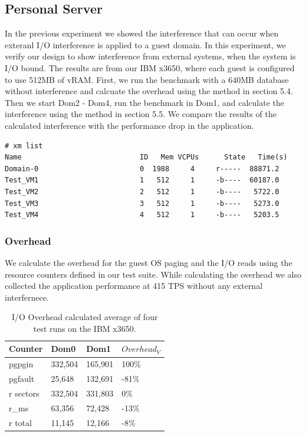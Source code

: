 \subsection{Personal Server}
In the previous experiment we showed the interference that can occur when exteranl I/O interference is applied to a guest domain.
In this experiment, we verify our design to show interference from external systems, when the system is I/O bound.
The results are from our IBM x3650, where each guest is configured to use 512MB of vRAM.
First, we run the benchmark with a 640MB database without interference and calcuate the overhead using the method in section 5.4.  
Then we start Dom2 - Dom4, run the benchmark in Dom1, and calculate the interference using the method in section 5.5.  
We compare the results of the calculated interference with the performance drop in the application.

\begin{Verbatim}
# xm list
Name                            ID   Mem VCPUs      State   Time(s)
Domain-0                        0  1988     4     r-----  88871.2
Test_VM1                        1   512     1     -b----  60187.0
Test_VM2                        2   512     1     -b----   5722.0
Test_VM3                        3   512     1     -b----   5273.0
Test_VM4                        4   512     1     -b----   5203.5
\end{Verbatim}

\subsubsection{Overhead}
We calculate the overhead for the guest OS paging and the I/O reads using the resource counters defined in our test suite.  While calculating the overhead we also collected the application performance at 415 TPS without any external interfernece.

\begin{table}[h]
\begin{tabular}{ l l l p{5cm} }
  Counter & Dom0 & Dom1 & $Overhead_V$ \\
  \hline
	pgpgin    & 332,504 & 165,901 & 100\% \\
	pgfault   &  25,648 & 132,691 & -81\% \\
	r sectors & 332,504 & 331,803 &   0\% \\
	r\_ms     &  63,356 &  72,428 & -13\% \\
	r total   &  11,145 &  12,166 &  -8\% \\
  \hline
\end{tabular}
\caption{I/O Overhead calculated average of four test runs on the IBM x3650.}
\label{tab:OverheadSmall}
\end{table}

